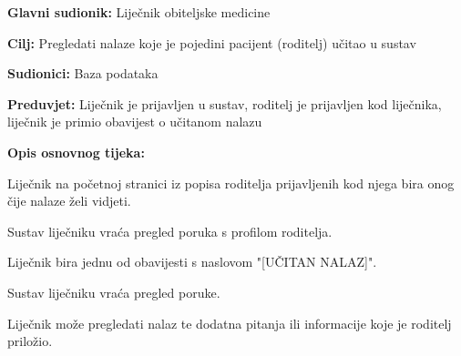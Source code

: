 					\noindent {}
					\begin{packed_item}
						
						\item \textbf{Glavni sudionik: }Liječnik obiteljske medicine
						\item  \textbf{Cilj:} Pregledati nalaze koje je pojedini pacijent (roditelj) učitao u sustav
						\item  \textbf{Sudionici:} Baza podataka
						\item  \textbf{Preduvjet:} Liječnik je prijavljen u sustav, roditelj je prijavljen kod liječnika, liječnik je primio obavijest o učitanom nalazu
						\item  \textbf{Opis osnovnog tijeka:}
						
						\item[] \begin{packed_enum}
							
							\item Liječnik na početnoj stranici iz popisa roditelja prijavljenih kod njega bira onog čije nalaze želi vidjeti.
							\item Sustav liječniku vraća pregled poruka s profilom roditelja.
							\item Liječnik bira jednu od obavijesti s naslovom "[UČITAN NALAZ]".
							\item Sustav liječniku vraća pregled poruke.
							\item Liječnik može pregledati nalaz te dodatna pitanja ili informacije koje je roditelj priložio.
						\end{packed_enum}
						
						
					\end{packed_item}
					
